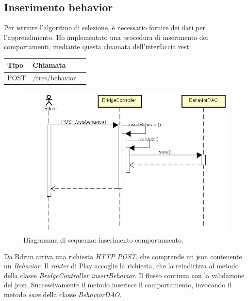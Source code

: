 \subsection{Inserimento behavior}
Per istruire l'algoritmo di selezione, è necessario fornire dei dati per l'apprendimento. Ho implementato una procedura di inserimento dei comportamenti, mediante questa chiamata dell'interfaccia \gls{rest}:
\def\arraystretch{1.5}
\begin{longtable}{|p{2.5cm}|p{5cm}|l|}
\hline
\textbf{Tipo} &	\textbf{Chiamata}	\\\hline
POST	&	/tres/behavior	 \\\hline
\end{longtable}
\begin{figure}[h]
\centering
\includegraphics[scale=0.42]{immagini/DSinsertBeh}
\caption{Diagramma di sequenza: inserimento comportamento.}
\label{fig:seq-inserimentobeh}
\end{figure}
Da Bdrim arriva una richiesta \emph{HTTP POST}, che comprende un \gls{json} contenente un \emph{Behavior}. Il \emph{router} di Play accoglie la richiesta, che la reindirizza al metodo della classe \emph{BridgeController insertBehavior}. Il flusso continua con la validazione del \gls{json}. Successivamente il metodo inserisce il comportamento, invocando il metodo \emph{save} della classe \emph{BehaviorDAO}. 


